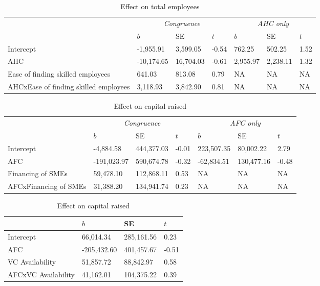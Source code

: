 \documentclass[
  english,
  man]{apa6}
\begin{document}
\begin{table}

\caption{\label{tab:unnamed-chunk-21}Effect on total employees}
\centering
\begin{tabular}[t]{l|l|l|l|l|l|l}
\hline
\multicolumn{1}{c|}{\em{ }} & \multicolumn{3}{c|}{\em{Congruence}} & \multicolumn{3}{c}{\em{AHC only}} \\
\cline{2-4} \cline{5-7}
  & $b$ & SE & $t$ & $b$ & SE & $t$\\
\hline
Intercept & -1,955.91 & 3,599.05 & -0.54 & 762.25 & 502.25 & 1.52\\
\hline
AHC & -10,174.65 & 16,704.03 & -0.61 & 2,955.97 & 2,238.11 & 1.32\\
\hline
Ease of finding skilled employees & 641.03 & 813.08 & 0.79 & NA & NA & NA\\
\hline
AHCxEase of finding skilled employees & 3,118.93 & 3,842.90 & 0.81 & NA & NA & NA\\
\hline
\end{tabular}
\end{table}

\begin{table}

\caption{\label{tab:unnamed-chunk-21}Effect on capital raised}
\centering
\begin{tabular}[t]{l|l|l|l|l|l|l}
\hline
\multicolumn{1}{c|}{\em{ }} & \multicolumn{3}{c|}{\em{Congruence}} & \multicolumn{3}{c}{\em{AFC only}} \\
\cline{2-4} \cline{5-7}
  & $b$ & SE & $t$ & $b$ & SE & $t$\\
\hline
Intercept & -4,884.58 & 444,377.03 & -0.01 & 223,507.35 & 80,002.22 & 2.79\\
\hline
AFC & -191,023.97 & 590,674.78 & -0.32 & -62,834.51 & 130,477.16 & -0.48\\
\hline
Financing of SMEs & 59,478.10 & 112,868.11 & 0.53 & NA & NA & NA\\
\hline
AFCxFinancing of SMEs & 31,388.20 & 134,941.74 & 0.23 & NA & NA & NA\\
\hline
\end{tabular}
\end{table}

\begin{table}

\caption{\label{tab:unnamed-chunk-21}Effect on capital raised}
\centering
\begin{tabular}[t]{l|l|l|l}
\hline
  & $b$ & SE & $t$\\
\hline
Intercept & 66,014.34 & 285,161.56 & 0.23\\
\hline
AFC & -205,432.60 & 401,457.67 & -0.51\\
\hline
VC Availability & 51,857.72 & 88,842.97 & 0.58\\
\hline
AFCxVC Availability & 41,162.01 & 104,375.22 & 0.39\\
\hline
\end{tabular}
\end{table}
\end{document}
